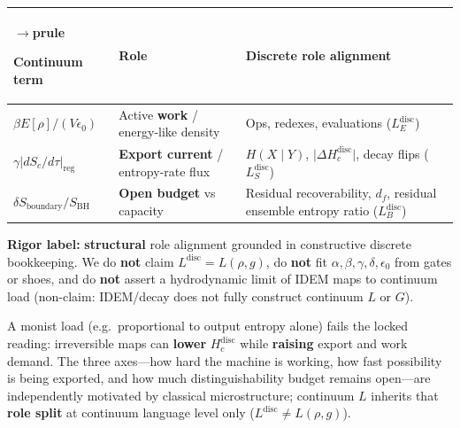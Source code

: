 \documentclass[
  11pt,
]{article}
\newcounter{none} %
\begin{document}
{\def\LTcaptype{none} %
\begin{longtable}[]{@{}
  >{\raggedright\arraybackslash}p{}
  >{\raggedright\arraybackslash}p{}
  >{\raggedright\arraybackslash}p{}@{}}
$\rightarrow$prule\noalign{}
\begin{minipage}[b]{\linewidth}\raggedright
Continuum term
\end{minipage} & \begin{minipage}[b]{\linewidth}\raggedright
Role
\end{minipage} & \begin{minipage}[b]{\linewidth}\raggedright
Discrete role alignment
\end{minipage} \\
\midrule\noalign{}
\endhead
\bottomrule\noalign{}
\endlastfoot
\(\beta E[\rho]/(V\epsilon_0)\) & Active \textbf{work} / energy-like density & Ops, redexes, evaluations (\(L_E^{\mathrm{disc}}\)) \\
\(\gamma\lvert dS_c/d\tau\rvert_{\mathrm{reg}}\) & \textbf{Export current} / entropy-rate flux & \(H(X\mid Y)\), \(\lvert\Delta H_c^{\mathrm{disc}}\rvert\), decay flips (\(L_S^{\mathrm{disc}}\)) \\
\(\delta S_{\mathrm{boundary}}/S_{\mathrm{BH}}\) & \textbf{Open budget} vs capacity & Residual recoverability, \(d_f\), residual ensemble entropy ratio (\(L_B^{\mathrm{disc}}\)) \\
\end{longtable}
}

\textbf{Rigor label:} \textbf{structural} role alignment grounded in constructive discrete bookkeeping. We do \textbf{not} claim \(L^{\mathrm{disc}}=L(\rho,g)\), do \textbf{not} fit \(\alpha,\beta,\gamma,\delta,\epsilon_0\) from gates or shoes, and do \textbf{not} assert a hydrodynamic limit of IDEM maps to continuum load (non-claim: IDEM/decay does not fully construct continuum \(L\) or \(G\)).

A monist load (e.g.~proportional to output entropy alone) fails the locked reading: irreversible maps can \textbf{lower} \(H_c^{\mathrm{disc}}\) while \textbf{raising} export and work demand. The three axes---how hard the machine is working, how fast possibility is being exported, and how much distinguishability budget remains open---are independently motivated by classical microstructure; continuum \(L\) inherits that \textbf{role split} at continuum language level only (\(L^{\mathrm{disc}}\neq L(\rho,g)\)).
\end{document}
